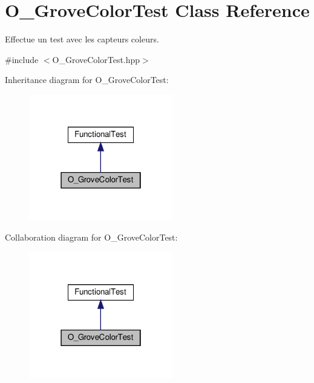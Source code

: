 \hypertarget{classO__GroveColorTest}{}\section{O\+\_\+\+Grove\+Color\+Test Class Reference}
\label{classO__GroveColorTest}


Effectue un test avec les capteurs coleurs.  




{\ttfamily \#include $<$O\+\_\+\+Grove\+Color\+Test.\+hpp$>$}



Inheritance diagram for O\+\_\+\+Grove\+Color\+Test\+:
\nopagebreak
\begin{figure}[H]
\begin{center}
\leavevmode
\includegraphics[width=178pt]{classO__GroveColorTest__inherit__graph}
\end{center}
\end{figure}


Collaboration diagram for O\+\_\+\+Grove\+Color\+Test\+:
\nopagebreak
\begin{figure}[H]
\begin{center}
\leavevmode
\includegraphics[width=178pt]{classO__GroveColorTest__coll__graph}
\end{center}
\end{figure}
